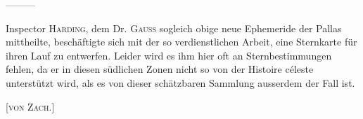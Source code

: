 —\quad—\quad—

Inspector \textsc{Harding}, dem Dr. \textsc{Gauss} sogleich obige neue Ephemeride der Pallas mittheilte, beschäftigte sich mit der so verdienstlichen Arbeit, eine Sternkarte für ihren Lauf zu entwerfen. Leider wird es ihm hier oft an Sternbestimmungen fehlen, da er in diesen südlichen Zonen nicht so von der Histoire céleste unterstützt wird, als es von dieser schätzbaren Sammlung ausserdem der Fall ist.

\hfill[\textsc{von Zach.}]
